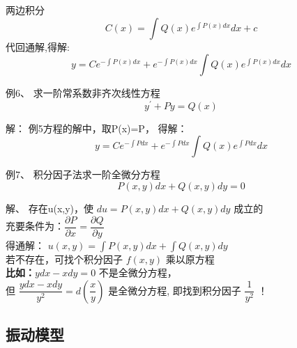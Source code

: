 \begin{frame}	
		两边积分
		\begin{equation*}
			C(x)=\int Q(x)e^{\int P(x)dx} dx+c 
		\end{equation*}	
		代回通解,得解:
		\begin{equation*}
			y=Ce^{-\int P(x)dx}+e^{-\int P(x)dx}\int Q(x)e^{\int P(x)dx} dx
		\end{equation*}	
\end{frame}

\begin{frame}
	\begin{exampleblock} {例6、	求一阶常系数非齐次线性方程}
	\begin{equation*}
		y^{\prime}+Py=Q(x)
	\end{equation*}
	\end{exampleblock} 
	\alert{解：} 例5方程的解中，取P(x)=P， 得解：
	\begin{equation*}
		y=Ce^{-\int Pdx}+e^{-\int Pdx}\int Q(x)e^{\int Pdx} dx
	\end{equation*}	
\end{frame}

\begin{frame}
	\begin{exampleblock} {例7、	积分因子法求一阶全微分方程}
	\begin{equation*}
	P(x,y)dx+Q(x,y)dy=0
	\end{equation*}
	\end{exampleblock} 
	\alert{解、}  存在u(x,y)，使 $ du=P(x,y)dx+Q(x,y)dy $ 成立的\\
    充要条件为：{$\dfrac{\partial P }{\partial x}=\dfrac{\partial Q }{\partial y}$ }\\	
	得通解：	{  $\displaystyle { u(x,y)=\int P(x,y)dx+\int Q(x,y)dy} $}\\ 
	若不存在，可找个积分因子 $f(x,y) $ 乘以原方程 \\  \vspace{0.2cm}
	\textbf{比如：}{\large    $ydx-xdy=0$ } 不是全微分方程，\\ 
	但 $\dfrac{ydx-xdy}{y^2}=d(\dfrac{x}{y})$ 是全微分方程, 即找到积分因子{  $ \dfrac{1}{y^2}$ } ！
\end{frame}

\subsection{振动模型}

